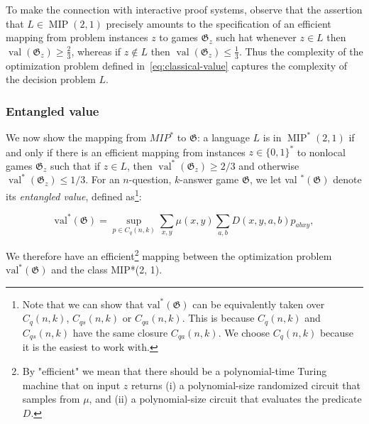 To make the connection with interactive proof systems, observe that the assertion that $L \in \operatorname{MIP}(2,1)$ precisely amounts to the specification of an efficient mapping from problem instances $z$ to games $\mathfrak{G}_{z}$ such hat whenever $z \in L$ then $\operatorname{val}\left(\mathfrak{G}_{z}\right) \geq \frac{2}{3}$, whereas if $z \notin L$ then $\operatorname{val}\left(\mathfrak{G}_{z}\right) \leq \frac{1}{3}$. Thus the complexity of the optimization problem defined in~\ref{eq:classical-value} captures the complexity of the decision problem $L$.

\subsubsection{Entangled value}\label{subsection:quantum-games}

We now show the mapping from $MIP^{*}$ to $\mathfrak{G}$: a language $L$ is in $\operatorname{MIP}^{*}(2,1)$ if and only if there is an efficient mapping from instances $z \in\{0,1\}^{*}$ to nonlocal games $\mathfrak{G}_{z}$ such that if $z \in L$, then $\operatorname{val}^{*}\left(\mathfrak{G}_{z}\right) \geq 2 / 3$ and otherwise $\operatorname{val}^{*}\left(\mathfrak{G}_{z}\right) \leq 1 / 3$.
 For an $n$-question, $k$-answer game $\mathfrak{G}$, we let val ${ }^{*}(\mathfrak{G})$ denote its \emph{entangled value}, defined as\footnote{Note that we can show that $\operatorname{val^{*}}(\mathfrak{G})$ can be equivalently taken over $C_{q}(n, k)$, $C_{q s}(n, k)$ or $C_{q a}(n, k)$. This is because $C_{q}(n, k)$ and $C_{q s}(n, k)$ have the same closure $C_{q a}(n, k)$. We choose $C_{q}(n, k)$ because it is the easiest to work with.}:

\begin{defn}\label{defn:entangled-value}
    \begin{equation}
    \operatorname{val^{*}}(\mathfrak{G})=\sup _{p \in C_{q}(n, k)} \sum_{x, y} \mu(x, y) \sum_{a, b} D(x, y, a, b) p_{a b x y},
    \end{equation}
\end{defn}


We therefore have an efficient\footnote{By "efficient" we mean that there should be a polynomial-time Turing machine that on input $z$ returns (i) a polynomial-size randomized circuit that samples from $\mu$, and (ii) a polynomial-size circuit that evaluates the predicate $D$.} mapping between the optimization problem $\operatorname{val^{*}}(\mathfrak{G})$ and the class MIP*(2, 1).


